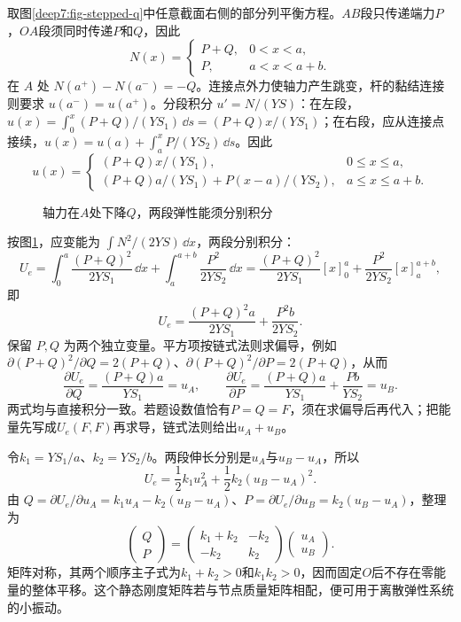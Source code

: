 \begin{solution}
取图\ref{deep7:fig-stepped-q}中任意截面右侧的部分列平衡方程。$AB$段只传递端力$P$，$OA$段须同时传递$P$和$Q$，因此
\[
 N(x)=\begin{cases}P+Q,&0<x<a,\\P,&a<x<a+b.\end{cases}
\]
在 $A$ 处 $N(a^+)-N(a^-)=-Q$。连接点外力使轴力产生跳变，杆的黏结连接则要求 $u(a^-)=u(a^+)$。分段积分 $u'=N/(YS)$：在左段，$u(x)=\int_0^x(P+Q)/(YS_1)\,\dd s=(P+Q)x/(YS_1)$；在右段，应从连接点接续，$u(x)=u(a)+\int_a^xP/(YS_2)\,\dd s$。因此
\[
 u(x)=\begin{cases}
 (P+Q)x/(YS_1),&0\le x\le a,\\
 (P+Q)a/(YS_1)+P(x-a)/(YS_2),&a\le x\le a+b.
 \end{cases}
\]
\begin{figure}[H]\centering
{}
\caption{轴力在$A$处下降$Q$，两段弹性能须分别积分}\label{deep7:fig-stepped-s}
\end{figure}
按图\ref{deep7:fig-stepped-s}，应变能为 $\int N^2/(2YS)\,\dd x$，两段分别积分：
\[
U_e=\int_0^a\frac{(P+Q)^2}{2YS_1}\,\dd x
+\int_a^{a+b}\frac{P^2}{2YS_2}\,\dd x
=\frac{(P+Q)^2}{2YS_1}[x]_0^a+\frac{P^2}{2YS_2}[x]_a^{a+b},
\]
即
\[
 U_e=\frac{(P+Q)^2a}{2YS_1}+\frac{P^2b}{2YS_2}.
\]
保留 $P,Q$ 为两个独立变量。平方项按链式法则求偏导，例如 $\partial(P+Q)^2/\partial Q=2(P+Q)$、$\partial(P+Q)^2/\partial P=2(P+Q)$，从而
\[
 \frac{\partial U_e}{\partial Q}=\frac{(P+Q)a}{YS_1}=u_A,
 \qquad
 \frac{\partial U_e}{\partial P}=\frac{(P+Q)a}{YS_1}+\frac{Pb}{YS_2}=u_B.
\]
两式均与直接积分一致。若题设数值恰有$P=Q=F$，须在求偏导后再代入；把能量先写成$U_e(F,F)$再求导，链式法则给出$u_A+u_B$。

令$k_1=YS_1/a$、$k_2=YS_2/b$。两段伸长分别是$u_A$与$u_B-u_A$，所以
\[
 U_e=\frac12k_1u_A^2+\frac12k_2(u_B-u_A)^2.
\]
由 $Q=\partial U_e/\partial u_A=k_1u_A-k_2(u_B-u_A)$、$P=\partial U_e/\partial u_B=k_2(u_B-u_A)$，整理为
\[
 \begin{pmatrix}Q\\P\end{pmatrix}
 =\begin{pmatrix}k_1+k_2&-k_2\\-k_2&k_2\end{pmatrix}
 \begin{pmatrix}u_A\\u_B\end{pmatrix}.
\]
矩阵对称，其两个顺序主子式为$k_1+k_2>0$和$k_1k_2>0$，因而固定$O$后不存在零能量的整体平移。这个静态刚度矩阵若与节点质量矩阵相配，便可用于离散弹性系统的小振动。
\end{solution}



